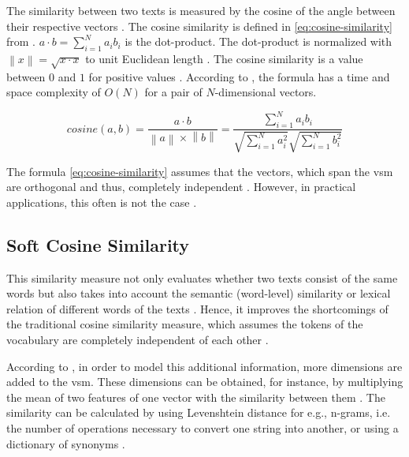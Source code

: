 The similarity between two texts is measured by the cosine of the angle between their respective vectors \cite{soft_cosine2014}.
The cosine similarity is defined in \autoref{eq:cosine-similarity} from \cite{soft_cosine2014}.
$a \cdot b = \sum_{i=1}^{N}a_{i}b_{i}$ is the dot-product.
The dot-product is normalized with $\left\| x \right\| = \sqrt{x \cdot x}$ to unit Euclidean length \cite{soft_cosine2014}.
The cosine similarity is a value between $0$ and $1$ for positive values \cite{soft_cosine2014}.
According to \citeauthor{soft_cosine2014}, the formula has a time and space complexity of $O(N)$ for a pair of $N$-dimensional vectors.

\begin{equation}
    cosine(a,b) = \frac{a \cdot b}{\left\| a \right\| \times \left\| b \right\|} = \frac{\sum_{i=1}^{N}a_{i}b_{i}}{\sqrt{\sum_{i=1}^{N}{a}^2_{i}}\sqrt{\sum_{i=1}^{N}{b}^2_{i}}}
    \label{eq:cosine-similarity}
\end{equation}

The formula \autoref{eq:cosine-similarity} assumes that the vectors, which span the \ac{vsm} are orthogonal and thus, 
completely independent \cite{soft_cosine2014}.
However, in practical applications, this often is not the case \cite{soft_cosine2014}.


\subsection{Soft Cosine Similarity}\label{subsec:soft-cosine-similarity}

This similarity measure not only evaluates whether two texts consist of the same words but 
also takes into account the semantic (word-level) similarity or lexical relation of different words of the texts \cite{soft_cosine2017}.
Hence, it improves the shortcomings of the traditional cosine similarity measure, 
which assumes the tokens of the vocabulary are completely independent of each other \cite{soft_cosine2014}.

According to \citeauthor{soft_cosine2014}, in order to model this additional information, more dimensions are added to the \ac{vsm}.
These dimensions can be obtained, for instance, by multiplying the mean of two features of one vector with the similarity between them \cite{soft_cosine2014}.
The similarity can be calculated by using Levenshtein distance for e.g., n-grams, i.e. the number of operations necessary to convert one string into another, 
or using a dictionary of synonyms \cite{soft_cosine2014}.

